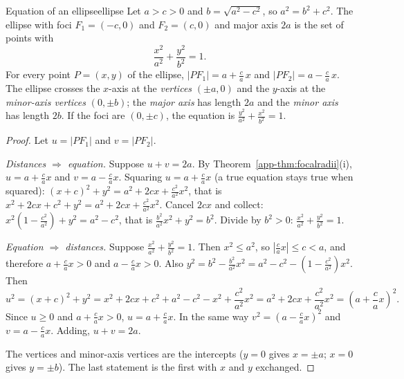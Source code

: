 \documentclass[11pt]{article}
\begin{document}
\begin{thm}{Equation of an ellipse}{ellipse}
Let $a>c>0$ and $b=\sqrt{a^2-c^2}$, so $a^2=b^2+c^2$. The ellipse with foci $F_1=(-c,0)$ and $F_2=(c,0)$ and major axis $2a$ is the set of points with
\[
\frac{x^2}{a^2}+\frac{y^2}{b^2}=1 .
\]
For every point $P=(x,y)$ of the ellipse, $\lvert PF_1\rvert=a+\frac ca\,x$ and $\lvert PF_2\rvert=a-\frac ca\,x$. The ellipse crosses the $x$-axis at the \emph{vertices} $(\pm a,0)$ and the $y$-axis at the \emph{minor-axis vertices} $(0,\pm b)$; the \emph{major axis} has length $2a$ and the \emph{minor axis} has length $2b$. If the foci are $(0,\pm c)$, the equation is $\frac{y^2}{a^2}+\frac{x^2}{b^2}=1$.
\end{thm}
\begin{proof}
Let $u=\lvert PF_1\rvert$ and $v=\lvert PF_2\rvert$.

\emph{Distances $\Rightarrow$ equation.} Suppose $u+v=2a$. By Theorem~\ref{app-thm:focalradii}(i), $u=a+\frac ca x$ and $v=a-\frac ca x$. Squaring $u=a+\frac cax$ (a true equation stays true when squared): $(x+c)^2+y^2=a^2+2cx+\frac{c^2}{a^2}x^2$, that is $x^2+2cx+c^2+y^2=a^2+2cx+\frac{c^2}{a^2}x^2$. Cancel $2cx$ and collect: $x^2\left(1-\frac{c^2}{a^2}\right)+y^2=a^2-c^2$, that is $\frac{b^2}{a^2}x^2+y^2=b^2$. Divide by $b^2>0$: $\frac{x^2}{a^2}+\frac{y^2}{b^2}=1$.

\emph{Equation $\Rightarrow$ distances.} Suppose $\frac{x^2}{a^2}+\frac{y^2}{b^2}=1$. Then $x^2\le a^2$, so $\left\lvert\frac cax\right\rvert\le c<a$, and therefore $a+\frac cax>0$ and $a-\frac cax>0$. Also $y^2=b^2-\frac{b^2}{a^2}x^2=a^2-c^2-\left(1-\frac{c^2}{a^2}\right)x^2$. Then
\[
u^2=(x+c)^2+y^2=x^2+2cx+c^2+a^2-c^2-x^2+\frac{c^2}{a^2}x^2=a^2+2cx+\frac{c^2}{a^2}x^2=\left(a+\frac cax\right)^2 .
\]
Since $u\ge0$ and $a+\frac cax>0$, $u=a+\frac cax$. In the same way $v^2=\left(a-\frac cax\right)^2$ and $v=a-\frac cax$. Adding, $u+v=2a$.

The vertices and minor-axis vertices are the intercepts ($y=0$ gives $x=\pm a$; $x=0$ gives $y=\pm b$). The last statement is the first with $x$ and $y$ exchanged.
\end{proof}
\end{document}
